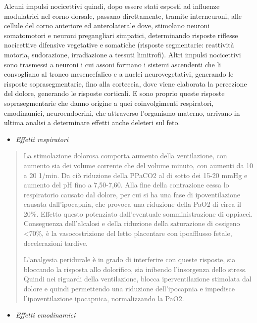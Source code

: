 \documentclass[]{article}
\begin{document}
Alcuni impulsi nocicettivi quindi, dopo essere stati esposti ad
influenze modulatrici nel corno dorsale, passano direttamente, tramite
interneuroni, alle cellule del corno anteriore ed anterolaterale dove,
stimolano neuroni somatomotori e neuroni pregangliari simpatici,
determinando risposte riflesse nocicettive difensive vegetative e
somatiche (risposte segmentarie: reattività motoria, sudorazione,
irradiazione a tessuti limitrofi). Altri impulsi nocicettivi sono
trasmessi a neuroni i cui assoni formano i sistemi ascendenti che li
convogliano al tronco mesencefalico e a nuclei neurovegetativi,
generando le risposte soprasegmentarie, fino alla corteccia, dove viene
elaborata la percezione del dolore, generando le risposte corticali. E
sono proprio queste risposte soprasegmentarie che danno origine a quei
coinvolgimenti respiratori, emodinamici, neuroendocrini, che attraverso
l'organismo materno, arrivano in ultima analisi a determinare effetti
anche deleteri sul feto.

\begin{itemize}
\item
  \emph{Effetti respiratori}
\end{itemize}

\begin{quote}
La stimolazione dolorosa comporta aumento della ventilazione, con
aumento sia dei volume corrente che del volume minuto, con aumenti da 10
a 20 1/min. Da ciò riduzione della PPaCO2 al di sotto dei 15-20 mmHg e
aumento del pH fino a 7,50-7,60. Alla fine della contrazione cessa lo
respiratorio causato dal dolore, per cui si ha una fase di
ipoventilazione causata dall'ipocapnia, che provoca una riduzione della
PaO2 di circa il 20\%. Effetto questo potenziato dall'eventuale
somministrazione di oppiacei. Conseguenza dell'alcalosi e della
riduzione della saturazione di ossigeno \textless{}70\%, è la
vasocostrizione del letto placentare con ipoafflusso fetale,
decelerazioni tardive.

L'analgesia peridurale è in grado di interferire con queste risposte,
sia bloccando la risposta allo dolorifico, sia inibendo l'insorgenza
dello stress. Quindi nei riguardi della ventilazione, blocca
iperventilazione stimolata dal dolore e quindi permettendo una riduzione
dell'ipocapnia e impedisce l'ipoventilazione ipocapnica, normalizzando
la PaO2.
\end{quote}

\begin{itemize}
\item
  \emph{Effetti emodinamici}
\end{itemize}
\end{document}
